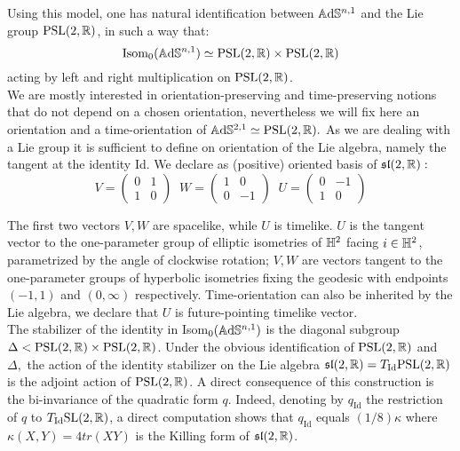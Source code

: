 Using this model, one has natural identification between $\mathbb{A}\mathrm{d}\mathbb{S}^{n,1}$ and the Lie group $\text{PSL}(2,\mathbb{R})$, in such a way that: 
\[
    \text{Isom}_0(\mathbb{A}\mathrm{d}\mathbb{S}^{n,1})\simeq \text{PSL}(2,\mathbb{R})\times\text{PSL}(2,\mathbb{R})
\]
acting by left and right multiplication on $\text{PSL}(2,\mathbb{R})$.\\ We are mostly interested in orientation-preserving and time-preserving notions that do not depend on a chosen orientation, nevertheless we will fix here an orientation and a time-orientation of $\mathbb{A}\mathrm{d}\mathbb{S}^{2,1}\simeq\text{PSL}(2,\mathbb{R}).$ As we are dealing with a Lie group it is sufficient to define on orientation of the Lie algebra, namely the tangent at the identity Id. We declare as (positive) oriented basis of $\mathfrak{sl}(2,\mathbb{R}):$ 
\[
V=\begin{pmatrix}
  0 & 1 \\ 1 & 0
\end{pmatrix}\;\;
W=\begin{pmatrix}
  1 & 0 \\ 0 & -1
\end{pmatrix}
\;\;
U=\begin{pmatrix}
  0 & -1 \\ 1 & 0
\end{pmatrix}
\]

The first two vectors $V,W$ are spacelike, while $U$ is timelike. $U$ is the tangent vector to the one-parameter group of elliptic isometries of $\mathbb{H}^2$ facing $i\in\mathbb{H}^2$, parametrized by the angle of clockwise rotation; $V,W$ are vectors tangent to the one-parameter groups of hyperbolic isometries fixing the geodesic with endpoints $(-1,1)$ and $(0,\infty)$ respectively. Time-orientation can also be inherited by the Lie algebra, we declare that $U$ is future-pointing timelike vector. \\

The stabilizer of the identity in Isom$_0(\mathbb{A}\mathrm{d}\mathbb{S}^{n,1})$ is the diagonal subgroup $\Delta<\text{PSL}(2,\mathbb{R})\times\text{PSL}(2,\mathbb{R})$. Under the obvious identification of $\text{PSL}(2,\mathbb{R})$ and $\Delta,$ the action of the identity stabilizer on the Lie algebra $\mathfrak{sl}(2,\mathbb{R})=T_{\text{Id}}\text{PSL}(2,\mathbb{R})$ is the adjoint action of $\text{PSL}(2,\mathbb{R})$. A direct consequence of this construction is the bi-invariance of the quadratic form $q$. Indeed, denoting by $q_{\text{Id}}$ the restriction of $q$ to $T_{\text{Id}}\text{SL}(2,\mathbb{R})$, a direct computation shows that $q_\text{Id}$ equals $(1/8)\kappa$ where $\kappa(X,Y)=4tr(XY)$ is the Killing form of $\mathfrak{sl}(2, \mathbb{R})$.

